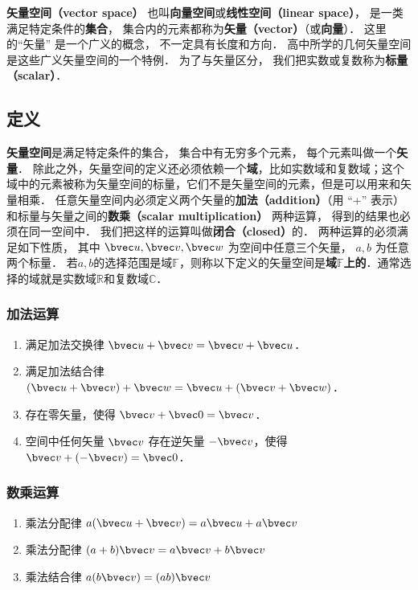 

\textbf{矢量空间（vector space）} 也叫\textbf{向量空间}或\textbf{线性空间（linear space）}， 是一类满足特定条件的\textbf{集合}， 集合内的元素都称为\textbf{矢量（vector）}（或\textbf{向量}）． 这里的“矢量” 是一个广义的概念， 不一定具有长度和方向． 高中所学的几何矢量空间是这些广义矢量空间的一个特例． 为了与矢量区分， 我们把实数或复数称为\textbf{标量（scalar）}．

\subsection{定义}
\textbf{矢量空间}是满足特定条件的集合， 集合中有无穷多个元素， 每个元素叫做一个\textbf{矢量}． 除此之外，矢量空间的定义还必须依赖一个\textbf{域}，比如实数域和复数域；这个域中的元素被称为矢量空间的标量，它们不是矢量空间的元素，但是可以用来和矢量相乘． 任意矢量空间内必须定义两个矢量的\textbf{加法（addition）}（用 “+” 表示）和标量与矢量之间的\textbf{数乘（scalar multiplication）} 两种运算， 得到的结果也必须在同一空间中． 我们把这样的运算叫做\textbf{闭合（closed）}的． 两种运算的必须满足如下性质， 其中 $\bvec u,\bvec v,\bvec w$ 为空间中任意三个矢量， $a,b$ 为任意两个标量． 若$a,b$的选择范围是域$\mathbb{F}$，则称以下定义的矢量空间是\textbf{域}$\mathbb{F}$\textbf{上的}．通常选择的域就是实数域$\mathbb{R}$和复数域$\mathbb{C}$．

\subsubsection{加法运算}
\begin{enumerate}
\item 满足加法交换律 $\bvec u + \bvec v = \bvec v + \bvec u$．
\item 满足加法结合律 $(\bvec u + \bvec v) + \bvec w = \bvec u + (\bvec v + \bvec w)$．
\item 存在零矢量，使得 $\bvec v + \bvec 0 = \bvec v$．
\item 空间中任何矢量 $\bvec v$ 存在逆矢量 $-\bvec v$，使得 $\bvec v + (-\bvec v) = \bvec 0$．
\end{enumerate}

\subsubsection{数乘运算}
\begin{enumerate}
\item 乘法分配律 $a(\bvec u + \bvec v) = a\bvec u + a\bvec v$ 
\item 乘法分配律 $(a + b)\bvec v = a\bvec v + b\bvec v$
\item 乘法结合律 $a (b \bvec v) = (ab) \bvec v$
\end{enumerate}

